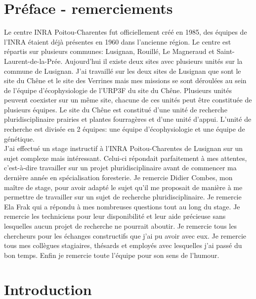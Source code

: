 \documentclass[12pt]{report}
\begin{document}
\tableofcontents


\chapter*{Préface - remerciements}

Le centre INRA Poitou-Charentes fut officiellement créé en 1985, des équipes
de l'INRA étaient déjà présentes en 1960 dans l'ancienne région. Le centre est répartis sur plusieurs communes:
Lusignan, Rouillé, Le Magneraud et Saint-Laurent-de-la-Prée. Aujourd'hui il
existe deux sites avec plusieurs unités sur la commune de Lusignan. J'ai
travaillé sur les deux sites de Lusignan que sont le site du Chêne et le site
des Verrines mais mes missions se sont déroulées au sein de l'équipe
d'écophysiologie de l'URP3F du site du Chêne. Plusieurs unités peuvent coexister
sur un même site, chacune de ces unités peut être constituée de plusieurs
équipes. Le site du Chêne est constitué d'une unité de recherche
pluridisciplinaire prairies et plantes fourragères et d'une unité d'appui.
L'unité de recherche est divisée en 2 équipes: une équipe d'écophysiologie et
une équipe de génétique.\\

J'ai effectué un stage instructif à l'INRA Poitou-Charentes de Lusignan sur un
sujet complexe mais intéressant. Celui-ci répondait parfaitement à mes attentes,
c'est-à-dire travailler sur un projet pluridisciplinaire avant de commencer ma
dernière année en spécialisation foresterie. Je remercie Didier Combes, mon
maître de stage, pour avoir adapté le sujet qu'il me proposait de manière à me
permettre de travailler sur un sujet de recherche pluridisciplinaire. Je
remercie Ela Frak qui a répondu à mes nombreuses questions tout au long du stage.
Je remercie les techniciens pour leur disponibilité et leur aide précieuse sans
lesquelles aucun projet de recherche ne pourrait aboutir. Je remercie tous les chercheurs pour
les échanges constructifs que j'ai pu avoir avec eux. Je remercie tous mes
collègues stagiaires, thésards et employés avec lesquelles j'ai passé du bon
temps. Enfin je remercie toute l'équipe pour son sens de l'humour.

\chapter{Introduction}
\end{document}
